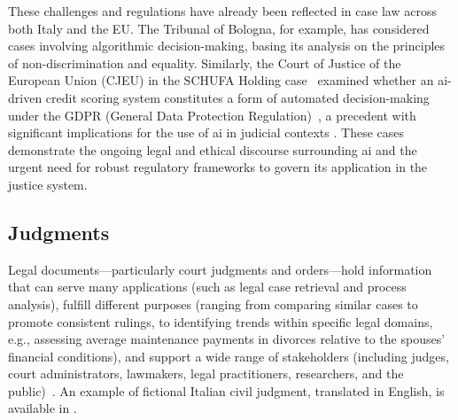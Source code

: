 These challenges and regulations have already been reflected in case law across both Italy and the EU. The Tribunal of Bologna, for example, has considered cases involving algorithmic decision-making, basing its analysis on the principles of non-discrimination and equality. Similarly, the Court of Justice of the European Union (CJEU) in the SCHUFA Holding case~\cite{schufaholding2023} examined whether an \ac{ai}-driven credit scoring system constitutes a form of automated decision-making under the GDPR (General Data Protection Regulation)~\cite{gdpr2016}, a precedent with significant implications for the use of \ac{ai} in judicial contexts \cite{juliahb2024}. These cases demonstrate the ongoing legal and ethical discourse surrounding \ac{ai} and the urgent need for robust regulatory frameworks to govern its application in the justice system.



\subsection{Judgments}
Legal documents—particularly court judgments and orders—hold information that can serve many applications (such as legal case retrieval and process analysis), fulfill different purposes (ranging from comparing similar cases to promote consistent rulings, to identifying trends within specific legal domains, e.g., assessing average maintenance payments in divorces relative to the spouses’ financial conditions), and support a wide range of stakeholders (including judges, court administrators, lawmakers, legal practitioners, researchers, and the public)~\cite{BELLANDI2024}.
An example of fictional Italian civil judgment, translated in English, is available in .

